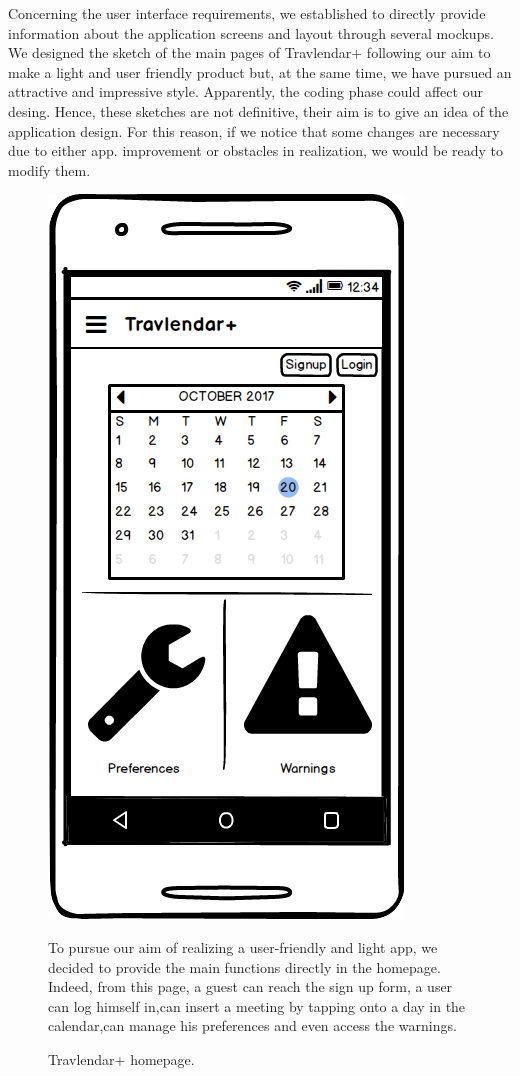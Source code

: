 
	\begin{flushleft}
		Concerning the user interface requirements, we established to directly provide information about the application screens and layout through several mockups. 
		We designed the sketch of the main pages of Travlendar+ following our aim to make a light and user friendly product but, at the same time, we have pursued an attractive and impressive style. 
		Apparently, the coding phase could affect our desing. Hence, these sketches are not definitive, their aim is to give an idea of the application design. 
		For this reason, if we notice that some changes are necessary due to either app. improvement or obstacles in realization, we would be ready to modify them. 
	\end{flushleft}
	
	\begin{figure}
		\centering
		\includegraphics[width=0.6\linewidth]{mockups/Homepage}
		\caption{Travlendar+ homepage.  
		}
	\label{fig:homepage}
	\begin{center}
		To pursue our aim of realizing a user-friendly and light app, we decided to provide the main functions directly in the homepage. Indeed, from this page, a guest can reach the sign up form, a user can log himself in,can insert a meeting by tapping onto a day in the calendar,can manage his preferences and even access the warnings. \\ 
	\end{center}
	\end{figure}
	
